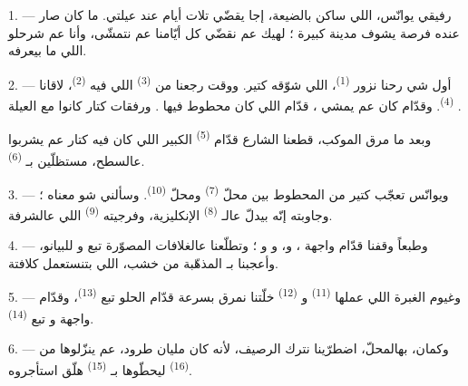 \VUsaut{4.0mm}
\VUsaut{3.0mm}

\VUsaut{3.0mm}

1. --- رفيقي يوانّس، اللي ساكن بالضيعة، إجا يقضّي تلات أيام عند
عيلتي.  ما كان صار عنده فرصة يشوف مدينة كبيرة ؛ لهيك عم
نقضّي كل أيّامنا عم نتمشّى، وأنا عم شرحلو اللي ما بيعرفه.

2. --- أول شي رحنا نزور  \textsuperscript{(1)}، اللي
شوّقه كتير. ووقت رجعنا من  \textsuperscript{(3)} اللي فيه
 \textsuperscript{(2)}، لاقانا 
\textsuperscript{(4)}. وقدّام  كان عم يمشي
، قدّام  اللي كان محطوط فيها
. ورفقات كتار كانوا مع العيلة .

وبعد ما مرق الموكب، قطعنا الشارع قدّام 
\textsuperscript{(5)} الكبير اللي كان فيه  كتار عم يشربوا
 عالسطح، مستظلّين بـ
\textsuperscript{(6)}.

3. --- ويوانّس تعجّب كتير من  المحطوط بين محلّ
 \textsuperscript{(7)} ومحلّ  \textsuperscript{(10)}. وسألني شو معناه ؛ وجاوبته إنّه بيدلّ
عالـ \textsuperscript{(8)} الإنكليزية، وفرجيته
 \textsuperscript{(9)} اللي عالشرفة.

\VUsaut{3.0mm}

4. --- وطبعاً وقفنا قدّام واجهة ،
و، و و ؛ وتطلّعنا
عالغلافات المصوّرة تبع  و للبيانو،
وأعجبنا بـ المذهّبة من خشب، اللي بتنستعمل كلافتة.

5. --- وغيوم الغبرة اللي عملها  \textsuperscript{(11)}
و \textsuperscript{(12)} خلّتنا نمرق بسرعة قدّام
 الحلو تبع  \textsuperscript{(13)}،
وقدّام واجهة  و تبع 
\textsuperscript{(14)}.

6. --- وكمان، بهالمحلّ، اضطرّينا نترك الرصيف، لأنه كان مليان طرود، عم
ينزّلوها من  \textsuperscript{(16)} ليحطّوها
بـ \textsuperscript{(15)} هلّق استأجروه.

